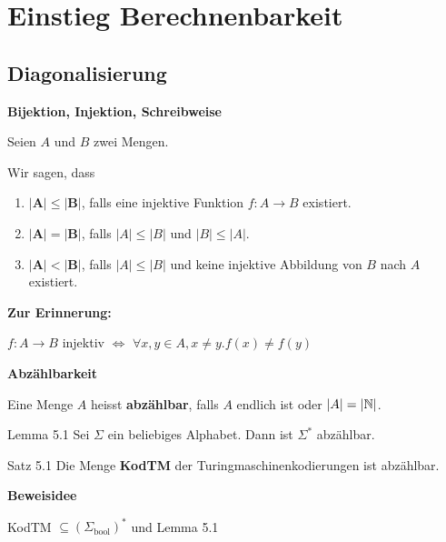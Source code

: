 \section{Einstieg Berechnenbarkeit}
        
\subsection{Diagonalisierung}


    \textbf{Bijektion, Injektion, Schreibweise}
    \begin{mainbox}{}
        Seien $A$ und $B$ zwei Mengen.

        Wir sagen, dass 
        \begin{enumerate}[label=\roman*.]
            \item $\mathbf{|A| \leq |B|}$, falls eine injektive Funktion $f: A \to B$ existiert.
            \item $\mathbf{|A| = |B|}$, falls $|A| \leq |B|$ und $|B| \leq |A|$.
            \item $\mathbf{|A| < |B|}$, falls $|A| \leq |B|$ und keine injektive Abbildung von $B$ nach $A$ existiert.
        \end{enumerate}
    \end{mainbox}
    \textbf{Zur Erinnerung:}
    \begin{center}
        $f: A \to B$ injektiv $\iff $ $\forall x,y \in A, x\neq y. f(x) \neq f(y)$
    \end{center}



    \textbf{Abzählbarkeit}
    \begin{mainbox}
        Eine Menge $A$ heisst \textbf{abzählbar}, falls $A$ endlich ist oder $|A| = |\mathbb{N}|$.
    \end{mainbox}
    \begin{subbox}{Lemma 5.1}
    Sei $\Sigma$ ein beliebiges Alphabet. Dann ist $\Sigma^*$ abzählbar.
    \end{subbox}


    \begin{mainbox}{Satz 5.1}
        Die Menge \textbf{KodTM} der Turingmaschinenkodierungen ist abzählbar.
    \end{mainbox}
    \textbf{Beweisidee}

    KodTM $\subseteq (\Sigma_{\text{bool}})^*$ und Lemma 5.1

